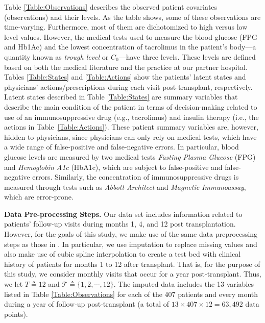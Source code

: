 \documentclass[opre,nonblindrev]{informs2}%
\newcommand{\teq}{\triangleq}
\newcommand{\1}{\hbox{\rm 1\kern-.35em 1}}
\newcommand{\MT}{\mathscr T}
\begin{document}
Table \ref{Table:Observations} describes the observed patient covariates (observations) and their levels. As the table shows, some of these observations are time-varying. Furthermore, most of them are dichotomized to high versus low level values. However, the medical tests  used to measure the blood glucose (FPG and Hb1Ac) and the lowest concentration of tacrolimus
in the patient's body---a quantity known as {\em trough level} or $C_0$---have three levels. These levels are defined based on both the medical literature and the practice at our partner hospital. Tables \ref{Table:States}  and \ref{Table:Actions} show the patients' latent states and physicians' actions/prescriptions during each visit post-transplant, respectively.   Latent states described in Table \ref{Table:States} are summary variables that describe the main condition of the patient in terms of decision-making related to use of an immunosuppressive drug (e.g., tacrolimus) and insulin therapy (i.e., the actions in  Table~\ref{Table:Actions}). These patient summary variables are, however, hidden to physicians,  since physicians can only rely on medical tests, which have a wide range of false-positive and false-negative errors. In particular, blood glucose levels are measured by two medical tests {\em Fasting Plasma Glucose} (FPG) and {\em Hemoglobin A1c} (HbA1c), which are subject to false-positive and false-negative errors. Similarly, the concentration of immunosuppressive drugs is measured through tests such as {\em Abbott Architect} and {\em Magnetic Immunoassay}, which are error-prone.






\noindent\textbf{Data Pre-processing Steps.} Our data set  includes information related to patients' follow-up visits during  months 1, 4, and 12 post transplantation. However, for the goals of this study,  we make use of the same data preprocessing steps as those in \citep{Boloori2020}. In particular, we  use imputation to replace missing values \citep[see also][]{Munshi2021} and also make use of cubic spline interpolation to create a test bed with clinical history of patients for months 1 to
12 after transplant. That is, for the purpose of this study, we consider monthly visits that occur for a year post-transplant. Thus, we let $T\teq 12$ and $\MT\teq\{1,2,\cdots, 12\}$. The imputed data includes the 13 variables listed in  Table \ref{Table:Observations} for each of the 407 patients and every month during a year of follow-up post-transplant (a total of $13\times 407\times 12=63,492$ data points).
\end{document}

